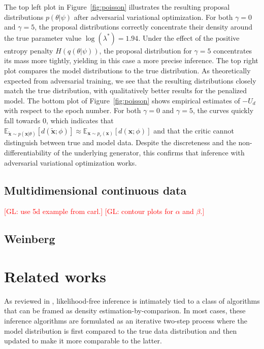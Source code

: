 \documentclass[twocolumn,superscriptaddress,aps]{revtex4-1}
\newcommand{\glnote}[1]{\textcolor{red}{[GL: #1]}}
\theoremstyle{plain}
\begin{document}
The top left plot in Figure~\ref{fig:poisson} illustrates the resulting proposal
distributions $p(\theta|\psi)$ after adversarial variational optimization.  For
both $\gamma=0$ and $\gamma=5$, the proposal distributions correctly concentrate
their density around the true parameter value $\log(\lambda^*) = 1.94$. Under
the effect of the positive entropy penalty $H(q(\theta|\psi))$,
the proposal distribution for $\gamma=5$ concentrates its mass more tightly,
yielding in this case a more precise inference.  The top right plot compares the
model distributions to the true distribution.  As theoretically expected from
adversarial training, we see that the resulting distributions closely match
the true distribution, with qualitatively  better results for the penalized
model.  The bottom plot of Figure~\ref{fig:poisson} shows empirical estimates
of $-U_d$ with respect to the epoch number. For both $\gamma=0$ and $\gamma=5$,
the curves quickly fall towards $0$, which indicates that
$\mathbb{E}_{\tilde{\mathbf{x}} \sim p(\mathbf{x}|\theta)}
[d(\tilde{\mathbf{x}};\phi)] \approx \mathbb{E}_{\mathbf{x} \sim
p_r(\mathbf{x})} [d(\mathbf{x};\phi)]$ and that the critic cannot distinguish
between true and model data. Despite the discreteness and the
non-differentiability of the underlying generator, this confirms that inference
with adversarial variational optimization works.


\subsection{Multidimensional continuous data}

\glnote{use 5d example from carl.}
\glnote{contour plots for $\alpha$ and $\beta$.}


\subsection{Weinberg}




\section{Related works}

As reviewed in \cite{2016arXiv161003483M}, likelihood-free inference is
intimately tied to a class of algorithms that can be framed as density
estimation-by-comparison. In most cases, these inference algorithms are
formulated as an iterative two-step process where the model distribution is
first compared to the true data distribution and then updated to make it more
comparable to the latter.
\end{document}
